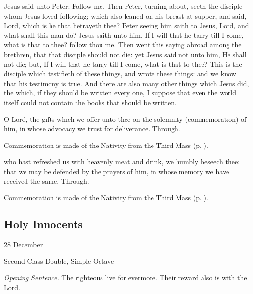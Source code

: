  Jesus said unto Peter: Follow me. Then Peter, turning about, seeth the disciple whom Jesus loved following; which also leaned on his breast at supper, and said, Lord, which is he that betrayeth thee? Peter seeing him saith to Jesus, Lord, and what shall this man do? Jesus saith unto him, If I will that he tarry till I come, what is that to thee? follow thou me. Then went this saying abroad among the brethren, that that disciple should not die: yet Jesus said not unto him, He shall not die; but, If I will that he tarry till I come, what is that to thee? This is the disciple which testifieth of these things, and wrote these things: and we know that his testimony is true. And there are also many other things which Jesus did, the which, if they should be written every one, I suppose that even the world itself could not contain the books that should be written.

\secret
{} O Lord, the gifts which we offer unto thee on the solemnity (commemoration) of him, in whose advocacy we trust for deliverance. Through.
\begin{rubric}
    Commemoration is made of the Nativity from the Third Mass (p. \pageref{NativityMassIIISecret}).
\end{rubric}
\postcommunion
{} who hast refreshed us with heavenly meat and drink, we humbly beseech thee: that we may be defended by the prayers of him, in whose memory we have received the same. Through.
\begin{rubric}
    Commemoration is made of the Nativity from the Third Mass (p. \pageref{NativityMassIIIPostcommunion}).
\end{rubric}


\clearpage
\subsection{Holy Innocents}
\begin{inhead}
{28 December}\par
{Second Class Double, Simple Octave}
\end{inhead}
\par\noindent
\textit{Opening Sentence.} The righteous live for evermore. Their reward also is with the Lord.

